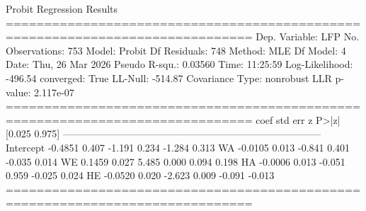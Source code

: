 \begin{script}[htbp]
\begin{outbit}
                          Probit Regression Results                           
==============================================================================
Dep. Variable:                    LFP   No. Observations:                  753
Model:                         Probit   Df Residuals:                      748
Method:                           MLE   Df Model:                            4
Date:                Thu, 26 Mar 2026   Pseudo R-squ.:                 0.03560
Time:                        11:25:59   Log-Likelihood:                -496.54
converged:                       True   LL-Null:                       -514.87
Covariance Type:            nonrobust   LLR p-value:                 2.117e-07
==============================================================================
                 coef    std err          z      P>|z|      [0.025      0.975]
------------------------------------------------------------------------------
Intercept     -0.4851      0.407     -1.191      0.234      -1.284       0.313
WA            -0.0105      0.013     -0.841      0.401      -0.035       0.014
WE             0.1459      0.027      5.485      0.000       0.094       0.198
HA            -0.0006      0.013     -0.051      0.959      -0.025       0.024
HE            -0.0520      0.020     -2.623      0.009      -0.091      -0.013
==============================================================================
\end{outbit}
\end{script}


